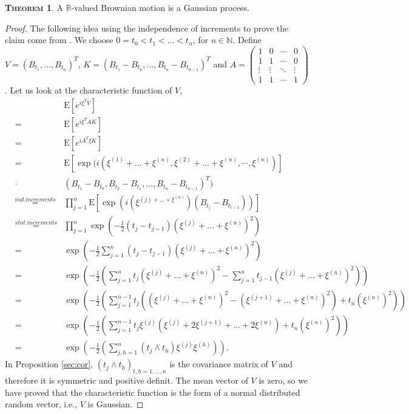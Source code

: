 \documentclass[a4paper, twoside, 11pt]{article}
\theoremstyle{definition}
\newtheorem{theorem}[definition]{\scshape Theorem}
\begin{document}
  \begin{theorem}
	A $\mathbb{R}$-valued Brownian motion is a Gaussian process.
  \end{theorem}
  \begin{proof}
	The following idea using the independence of increments to prove the claim come from \cite{shilling}.
	We choose $0=t_0<t_1<\dots<t_n$, for $n \in \mathbb{N}$. Define
	$V = (B_{t_1},\dots,B_{t_n})^T$,  $K = (B_{t_1}-B_{t_0},\dots, B_{t_n}-B_{t_{n-1}})^T$ and 
	$A = 
	\begin{pmatrix}
	  1      & 0      & \cdots & 0\\
	  1      & 1      & \cdots & 0\\
	  \vdots & \vdots & \ddots & \vdots \\
	  1      & 1      & \cdots & 1
	\end{pmatrix}
	  $.
	Let us look at the characteristic function of $V$,
	\begin{eqnarray*}
	  &&\mathrm{E} [e^{i\xi^T V}]\\
	  &=& \mathrm{E} [e^{i\xi^T AK}]\\ 
	  &=& \mathrm{E} [e^{iA^T\xi K}]\\
	  &=& \mathrm{E} [\exp(i (\xi^{(1)}+\dots+\xi^{(n)}, \xi^{(2)}+\dots+\xi^{(n)}, \cdots,\xi^{(n)})] \\
	  &\cdot& (B_{t_1}-B_{t_0}, B_{t_2}-B_{t_1},\dots,B_{t_n}-B_{t_{n-1}})^T)\\
	  &\overset{ind.increments}{=}& \prod_{j=1}^n \mathrm{E} [\exp(i(\xi^{(j)+\dots+\xi^{(n)}})(B_{t_j}-B_{t_{t-1}}))]\\
	  &\overset{stat.increments}{=}& \prod_{j=1}^n \exp(-\frac{1}{2}(t_j - t_{j-1})(\xi^{(j)}+\dots+\xi^{(n)})^2) \\
	  &=& \exp\left(-\frac{1}{2}\sum_{j=1}^n (t_j - t_{j-1})(\xi^{(j)}+\dots+\xi^{(n)})^2\right)\\
	  &=& \exp\left(-\frac{1}{2}\left(\sum_{j=1}^n t_j(\xi^{(j)}+\dots+\xi^{(n)})^2 - \sum_{j=1}^n t_{j-1}(\xi^{(j)}+\dots+\xi^{(n)})^2\right)\right)\\
	  &=& \exp\left(-\frac{1}{2}\left(\sum_{j=1}^{n-1} t_j((\xi^{(j)}+\dots+\xi^{(n)})^2 - (\xi^{(j+1)}+\dots+\xi^{(n)})^2) + t_n(\xi^{(n)})^2\right)\right)\\
	  &=& \exp\left(-\frac{1}{2}\left(\sum_{j=1}^{n-1} t_j\xi^{(j)}(\xi^{(j)}+2\xi^{(j+1)}+\dots+2\xi^{(n)}) + t_n(\xi^{(n)})^2\right)\right)\\
	  &=& \exp\left(-\frac{1}{2}\left(\sum_{j,h=1}^n(t_j\wedge t_h)\xi^{(j)}\xi^{(h)}\right)\right).
	\end{eqnarray*}
	In Proposition \ref{sec:cor}, $(t_j\wedge t_h)_{t,h=1,\dots,n}$ is the covariance matrix of $V$ and therefore it is symmetric and positive definit. The mean vector of $V$ is zero, so we have proved that the characteristic function is the form of a normal distributed random vector, i.e., $V$ is Gaussian.
  \end{proof}
\end{document}
